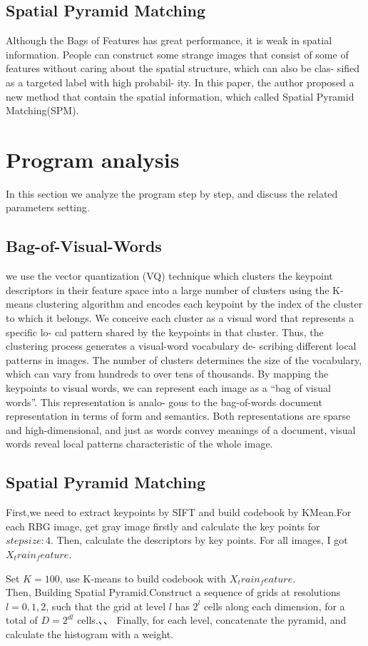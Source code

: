 \documentclass[10pt,twocolumn,letterpaper]{article}
\begin{document}
\subsection{Spatial Pyramid Matching}
Although the Bags of Features has great performance, it is weak in spatial information. People can construct some strange images that consist of some of features without caring about the spatial structure, which can also be clas- sified as a targeted label with high probabil- ity. In this paper, the author proposed a new method that contain the spatial information, which called Spatial Pyramid Matching(SPM).
 
\section{Program analysis}
In this section we analyze the program step by step, and discuss the related parameters setting.\\
\subsection{Bag-of-Visual-Words}
 \indent we use the vector quantization (VQ) technique which clusters the keypoint descriptors in their feature space into a large number of clusters using the K-means clustering algorithm and encodes each keypoint by the index of the cluster to which it belongs. We conceive each cluster as a visual word that represents a specific lo- cal pattern shared by the keypoints in that cluster. Thus, the clustering process generates a visual-word vocabulary de- scribing different local patterns in images. The number of clusters determines the size of the vocabulary, which can vary from hundreds to over tens of thousands. By mapping the keypoints to visual words, we can represent each image as a “bag of visual words”. This representation is analo- gous to the bag-of-words document representation in terms of form and semantics. Both representations are sparse and high-dimensional, and just as words convey meanings of a document, visual words reveal local patterns characteristic of the whole image.
\subsection{Spatial Pyramid Matching}
	 First,we need  to extract keypoints by SIFT and build codebook by KMean.For each RBG image, get gray image firstly and calculate the key points for $step size: 4$. Then, calculate the descriptors by key points. For all images, I got $X_train_feature$.\\
	 \par Set $K = 100$, use K-means to build codebook with $X_train_feature$.\\
	 \indent Then, Building Spatial Pyramid.Construct a sequence of grids at resolutions $l=0,1,2$, such that the grid at level $l$ has $2^l$ cells along each dimension, for a total of $D = 2^{dl}$ cells.、、
	 \indent Finally, for each level, concatenate the pyramid, and calculate the histogram with a weight.
\end{document}
